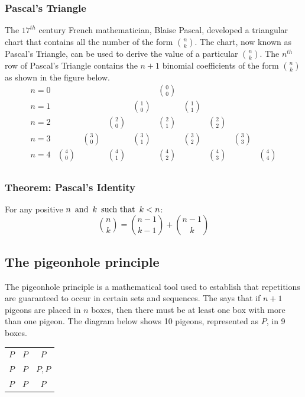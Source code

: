 \subsubsection*{Pascal's Triangle}
The $17^{th}$ century French mathematician, Blaise Pascal, developed a triangular chart that contains all the number of the form $\binom{n}{k}$. The chart, now known as Pascal's Triangle, can be used to derive the value of a particular $\binom{n}{k}$. The $n^{th}$ row of Pascal's Triangle contains the $n+1$ binomial coefficients of the form $\binom{n}{k}$ as shown in the figure below.
\[
  \begin{array}{cccccccccc}
    n=0 &              &              &              &              & \binom{0}{0} &              &              &                             \\
    n=1 &              &              &              & \binom{1}{0} &              & \binom{1}{1} &              &                             \\
    n=2 &              &              & \binom{2}{0} &              & \binom{2}{1} &              & \binom{2}{2} &                             \\
    n=3 &              & \binom{3}{0} &              & \binom{3}{1} &              & \binom{3}{2} &              & \binom{3}{3}                \\
    n=4 & \binom{4}{0} &              & \binom{4}{1} &              & \binom{4}{2} &              & \binom{4}{3} &              & \binom{4}{4} \\
  \end{array}
\]

\subsubsection*{Theorem: Pascal's Identity}
For any positive $n \operatorname{~\text{and}~} k \operatorname{~\text{such that}~} k < n$:
\[
  \binom{n}{k} = \binom{n-1}{k-1} + \binom{n-1}{k}
\]

\subsection{The pigeonhole principle}
The pigeonhole principle is a mathematical tool used to establish that repetitions are guaranteed to occur in certain sets and sequences. The  says that if $n+1$ pigeons are placed in $n$ boxes, then there must be at least one box with more than one pigeon. The diagram below shows 10 pigeons, represented as $P$, in 9 boxes.
\begin{center}
  \begin{tabular}{ccc}
    $P$ & $P$ & $P$   \\
    $P$ & $P$ & $P,P$ \\
    $P$ & $P$ & $P$
  \end{tabular}
\end{center}

